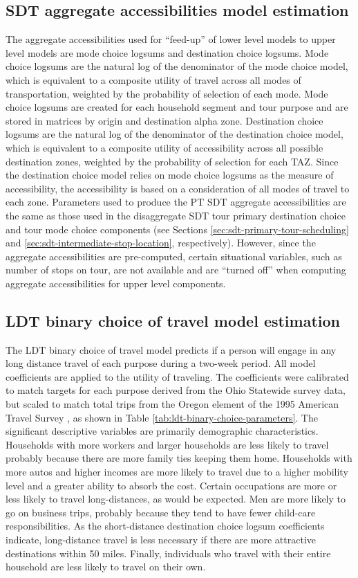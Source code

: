 \subsection{SDT aggregate accessibilities model estimation}
The aggregate accessibilities used for ``feed-up'' of lower level models to upper level models are mode choice logsums and destination choice logsums. Mode choice logsums are the natural log of the denominator of the mode choice model, which is equivalent to a composite utility of travel across all modes of transportation, weighted by the probability of selection of each mode. Mode choice logsums are created for each household segment and tour purpose and are stored in matrices by origin and destination alpha zone. Destination choice logsums are the natural log of the denominator of the destination choice model, which is equivalent to a composite utility of accessibility across all possible destination zones, weighted by the probability of selection for each TAZ. Since the destination choice model relies on mode choice logsums as the measure of accessibility, the accessibility is based on a consideration of all modes of travel to each zone. Parameters used to produce the PT SDT aggregate accessibilities are the same as those used in the disaggregate SDT tour primary destination choice and tour mode choice components (see Sections \ref{sec:sdt-primary-tour-scheduling} and \ref{sec:sdt-intermediate-stop-location}, respectively). However, since the aggregate accessibilities are pre-computed, certain situational variables, such as number of stops on tour, are not available and are ``turned off'' when computing aggregate accessibilities for upper level components.

\subsection{LDT binary choice of travel model estimation}
The LDT binary choice of travel model predicts if a person will engage in any long distance travel of each purpose during a two-week period. All model coefficients are applied to the utility of traveling. The coefficients were calibrated to match targets for each purpose derived from the Ohio Statewide survey data, but scaled to match total trips from the Oregon element of the 1995 American Travel Survey \citep{bts97}, as shown in Table \ref{tab:ldt-binary-choice-parameters}. The significant descriptive variables are primarily demographic characteristics. Households with more workers and larger households are less likely to travel probably because there are more family ties keeping them home. Households with more autos and higher incomes are more likely to travel due to a higher mobility level and a greater ability to absorb the cost. Certain occupations are more or less likely to travel long-distances, as would be expected. Men are more likely to go on business trips, probably because they tend to have fewer child-care responsibilities. As the short-distance destination choice logsum coefficients indicate, long-distance travel is less necessary if there are more attractive destinations within 50 miles. Finally, individuals who travel with their entire household are less likely to travel on their own. 

